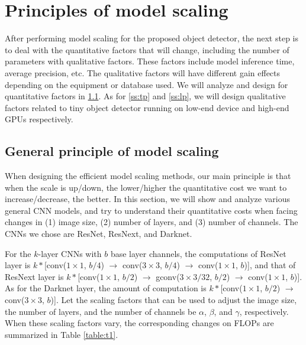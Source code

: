 \documentclass[10pt,twocolumn,letterpaper]{article}
\begin{document}
\section{Principles of model scaling}

After performing model scaling for the proposed object detector, the next step is to deal with the quantitative factors that will change, including the number of parameters with qualitative factors.  These factors include model inference time, average precision, etc.  The qualitative factors will have different gain effects depending on the equipment or database used.  We will analyze and design for quantitative factors in \ref{ss:gp}.  As for \ref{ss:tp} and \ref{ss:lp}, we will design qualitative factors related to tiny object detector running on low-end device and high-end GPUs respectively.

\subsection{General principle of model scaling}
\label{ss:gp}

When designing the efficient model scaling methods, our main principle is that when the scale is up/down, the lower/higher the quantitative cost we want to increase/decrease, the better.  In this section, we will show and analyze various general CNN models, and try to understand their quantitative costs when facing changes in (1) image size, (2) number of layers, and (3) number of channels.  The CNNs we chose are ResNet, ResNext, and Darknet.

For the $k$-layer CNNs with $b$ base layer channels, the computations of ResNet layer is $k*$[conv($1\times1$, $b/4$) $\rightarrow$ conv($3\times3$, $b/4$) $\rightarrow$ conv($1\times1$, $b$)], and that of ResNext layer is $k*$[conv($1\times1$, $b/2$) $\rightarrow$ gconv($3\times3/32$, $b/2$) $\rightarrow$ conv($1\times1$, $b$)].  As for the Darknet layer, the amount of computation is $k*$[conv($1\times1$, $b/2$) $\rightarrow$ conv($3\times3$, $b$)].  Let the scaling factors that can be used to adjust the image size, the number of layers, and the number of channels be $\alpha$, $\beta$, and $\gamma$, respectively.  When these scaling factors vary, the corresponding changes on FLOPs are summarized in Table \ref{table:t1}.
\end{document}
